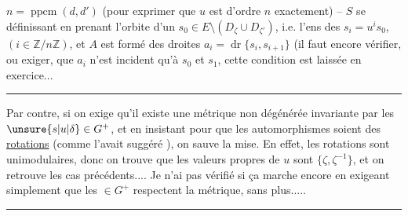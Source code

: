 
$n=\operatorname{ppcm}(d,d')$ (pour exprimer que $u$ est d'ordre $n$ exactement) -- $S$ se définissant en prenant l'orbite d'un $s_0\in E\setminus(D_\zeta\cup D_{\zeta'})$,  i.e. l'ens des $s_i=u^i s_0$,  $(i\in\mathbb Z/n\mathbb Z)$, et $A$ est formé des droites $a_i=\operatorname{dr}\{s_i,s_{i+1}\}$ (il faut encore vérifier, ou exiger, que $a_i$ n'est incident qu'à $s_0$ et $s_1$, cette condition est laissée en exercice...

\rule{1.7cm}{.35pt}

Par contre, si on exige  qu'il existe une métrique non dégénérée invariante par les $\unsure{s|u|\delta}\in G^+$, et en insistant pour que les automorphismes soient des \uline{rotations} (comme l'avait suggéré ), on sauve la mise. En effet, les rotations sont unimodulaires, donc on trouve que les valeurs propres de $u$ sont $\{\zeta,\zeta^{-1}\}$, et on retrouve les cas précédents.... Je n'ai pas vérifié si ça marche encore en exigeant simplement que les $\in G^+$ respectent la métrique, sans plus.....

\rule{2.2cm}{.35pt}

